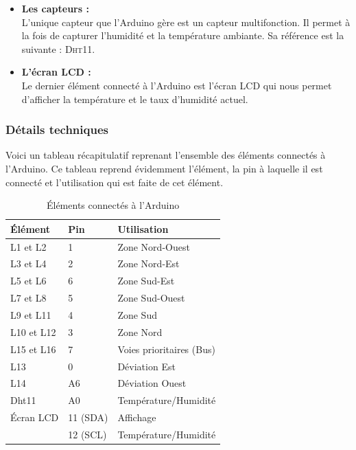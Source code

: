 \begin{itemize}
\item \textbf{Les capteurs :}\\
L’unique capteur que l’Arduino gère est un capteur multifonction. Il permet à la fois de capturer l’humidité et la température ambiante. Sa référence est la suivante : \textsc{Dht11}.

\item \textbf{L’écran LCD :}\\
Le dernier élément connecté à l’Arduino est l’écran LCD qui nous permet d’afficher la température et le taux d’humidité actuel.
\end{itemize}

\subsubsection{Détails techniques}\label{details-techniques}
Voici un tableau récapitulatif reprenant l’ensemble des éléments connectés à l’Arduino. Ce tableau reprend évidemment l’élément, la pin à laquelle il est connecté et l’utilisation qui est faite de cet élément.
\begin{table}[H]
\centering
\captionsetup{width=\textwidth}
{\renewcommand{\arraystretch}{1.5}
    \begin{tabular}{| l | l | l |}
    \hline
    \textbf{Élément} & \textbf{Pin} & \textbf{Utilisation}\\
    \hline
    L1 et L2 & 1 & Zone Nord-Ouest\\
    \hline
    L3 et L4 & 2 & Zone Nord-Est\\
    \hline
    L5 et L6 & 6 & Zone Sud-Est\\
    \hline
    L7 et L8 & 5 & Zone Sud-Ouest\\
    \hline
    L9 et L11 & 4 & Zone Sud\\
    \hline
    L10 et L12 & 3 & Zone Nord\\
    \hline
    L15 et L16 & 7 & Voies prioritaires (Bus)\\
    \hline
    L13 & 0 & Déviation Est\\
    \hline
    L14 & A6 & Déviation Ouest\\
    \hline
    Dht11 & A0 & Température/Humidité\\
    \hline
    Écran LCD & 11 (SDA) & Affichage\\
    & 12 (SCL) & Température/Humidité\\
    \hline
    \end{tabular}}
    \caption{Éléments connectés à l'Arduino}
\end{table}

